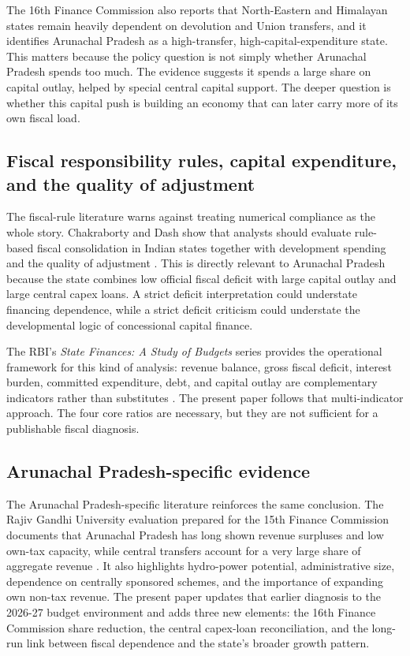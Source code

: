 \documentclass[11pt,a4paper]{article}
\begin{document}
The 16th Finance Commission also reports that North-Eastern and Himalayan states remain heavily dependent on devolution and Union transfers, and it identifies Arunachal Pradesh as a high-transfer, high-capital-expenditure state. This matters because the policy question is not simply whether Arunachal Pradesh spends too much. The evidence suggests it spends a large share on capital outlay, helped by special central capital support. The deeper question is whether this capital push is building an economy that can later carry more of its own fiscal load.

\subsection{Fiscal responsibility rules, capital expenditure, and the quality of adjustment}

The fiscal-rule literature warns against treating numerical compliance as the whole story. Chakraborty and Dash show that analysts should evaluate rule-based fiscal consolidation in Indian states together with development spending and the quality of adjustment \citep{chakraborty_dash_2013}. This is directly relevant to Arunachal Pradesh because the state combines low official fiscal deficit with large capital outlay and large central capex loans. A strict deficit interpretation could understate financing dependence, while a strict deficit criticism could understate the developmental logic of concessional capital finance.

The RBI's \emph{State Finances: A Study of Budgets} series provides the operational framework for this kind of analysis: revenue balance, gross fiscal deficit, interest burden, committed expenditure, debt, and capital outlay are complementary indicators rather than substitutes \citep{rbi_state_finances_2023}. The present paper follows that multi-indicator approach. The four core ratios are necessary, but they are not sufficient for a publishable fiscal diagnosis.

\subsection{Arunachal Pradesh-specific evidence}

The Arunachal Pradesh-specific literature reinforces the same conclusion. The Rajiv Gandhi University evaluation prepared for the 15th Finance Commission documents that Arunachal Pradesh has long shown revenue surpluses and low own-tax capacity, while central transfers account for a very large share of aggregate revenue \citep{nayak_rgu_2019}. It also highlights hydro-power potential, administrative size, dependence on centrally sponsored schemes, and the importance of expanding own non-tax revenue. The present paper updates that earlier diagnosis to the 2026-27 budget environment and adds three new elements: the 16th Finance Commission share reduction, the central capex-loan reconciliation, and the long-run link between fiscal dependence and the state's broader growth pattern.
\end{document}
